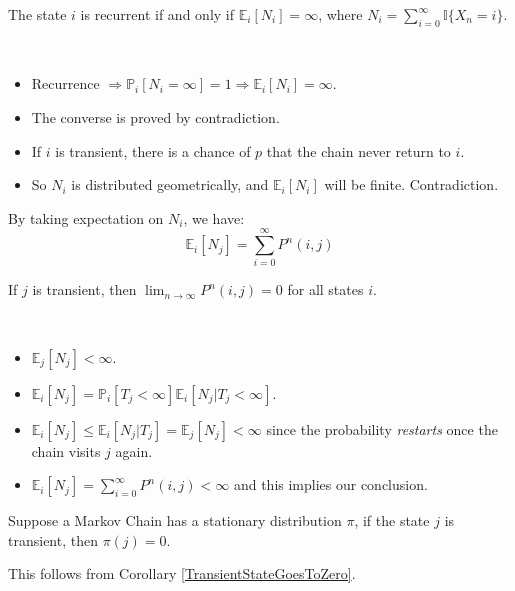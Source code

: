 \begin{theorem}
    \normalfont
    The state $i$ is recurrent if and only if $\mathbb{E}_i[N_i] = \infty$, where $N_i = \sum_{i=0}^\infty\mathbb{I}\{X_n = i\}$.
\end{theorem}
\begin{sketchproof}
    ~{}
    \begin{itemize}
        \item Recurrence $\Rightarrow \mathbb{P}_i[N_i = \infty] = 1 \Rightarrow \mathbb{E}_i[N_i] = \infty$.
        \item The converse is proved by contradiction.
        \item If $i$ is transient, there is a chance of $p$ that the chain never return to $i$.
        \item So $N_i$ is distributed geometrically, and $\mathbb{E}_i[N_i]$ will be finite. Contradiction.
    \end{itemize}
\end{sketchproof}
\begin{remark}
    By taking expectation on $N_i$, we have:
    \[ \mathbb{E}_i[N_j] = \sum_{i=0}^\infty P^n(i,j) \]
\end{remark}

\begin{corollary}\label{TransientStateGoesToZero}
    If $j$ is transient, then $\lim_{n\to\infty}P^n(i,j) = 0$ for all states $i$.
\end{corollary}
\begin{sketchproof}
    ~{}
    \begin{itemize}
        \item $\mathbb{E}_j[N_j] < \infty$.
        \item $\mathbb{E}_i[N_j] = \mathbb{P}_i[T_j < \infty]\mathbb{E}_i[N_j | T_j < \infty]$.
        \item $\mathbb{E}_i[N_j] \le \mathbb{E}_i[N_j | T_j] = \mathbb{E}_j[N_j] < \infty$ since the probability \emph{restarts} once the chain visits $j$ again.
        \item $\mathbb{E}_i[N_j] = \sum_{i=0}^\infty P^n(i,j) < \infty$ and this implies our conclusion.
    \end{itemize}
\end{sketchproof}

\begin{proposition}
    Suppose a Markov Chain has a stationary distribution $\pi$, if the state $j$ is transient, then $\pi(j) = 0$.
\end{proposition}
This follows from Corollary \ref{TransientStateGoesToZero}.

